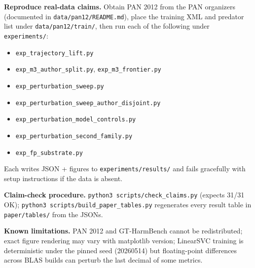 \documentclass[letterpaper,twocolumn,10pt]{article}
\begin{document}
\textbf{Reproduce real-data claims.} Obtain PAN 2012 from the PAN organizers
(documented in \texttt{data/pan12/README.md}), place the training XML and
predator list under \texttt{data/pan12/train/}, then run each of the
following under \texttt{experiments/}:
\begin{itemize}\footnotesize
\item \texttt{exp\_trajectory\_lift.py}
\item \texttt{exp\_m3\_author\_split.py}, \texttt{exp\_m3\_frontier.py}
\item \texttt{exp\_perturbation\_sweep.py}
\item \texttt{exp\_perturbation\_sweep\_author\_disjoint.py}
\item \texttt{exp\_perturbation\_model\_controls.py}
\item \texttt{exp\_perturbation\_second\_family.py}
\item \texttt{exp\_fp\_substrate.py}
\end{itemize}
Each writes JSON + figures to \texttt{experiments/results/} and fails
gracefully with setup instructions if the data is absent.

\textbf{Claim-check procedure.} \texttt{python3 scripts/check\_claims.py}
(expects 31/31 OK); \texttt{python3 scripts/build\_paper\_tables.py}
regenerates every result table in \texttt{paper/tables/} from the JSONs.

\textbf{Known limitations.} PAN 2012 and GT-HarmBench cannot be
redistributed; exact figure rendering may vary with matplotlib version;
LinearSVC training is deterministic under the pinned seed (20260514) but
floating-point differences across BLAS builds can perturb the last decimal
of some metrics.
\end{document}
